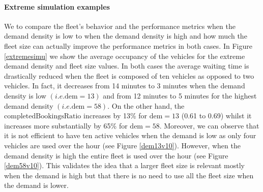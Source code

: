 \documentclass[12pt,a4paper]{article}
\begin{document}
\paragraph{Extreme simulation examples}
We to compare the fleet's behavior and the performance metrics when the demand density is low to when the demand density is high and how much the fleet size can actually improve the performance metrics in both cases. In Figure \ref{extremesimu} we show the average occupancy of the vehicles for the extreme demand density and fleet size values. In both cases the average waiting time is drastically reduced when the fleet is composed of ten vehicles as opposed to two vehicles. In fact, it decreases from 14 minutes to 3 minutes when the demand density is low $(i.e. \text{dem}=13)$ and from 12 minutes to 5 minutes for the highest demand density  $(i.e. \text{dem}=58)$. On the other hand, the $\text{completedBookingsRatio}$ increases by 13\% for $\text{dem}=13$ (0.61 to 0.69) whilst it increases more substantially by 65\% for $\text{dem} = 58$. Moreover, we can observe that it is not efficient to have ten active vehicles when the demand is low as only four vehicles are used over the hour (see Figure \ref{dem13v10}). However, when the demand density is high the entire fleet is used over the hour (see Figure \ref{dem58v10}). This validates the idea that a larger fleet size is relevant mostly when the demand is high but that there is no need to use all the fleet size when the demand is lower.
\end{document}
